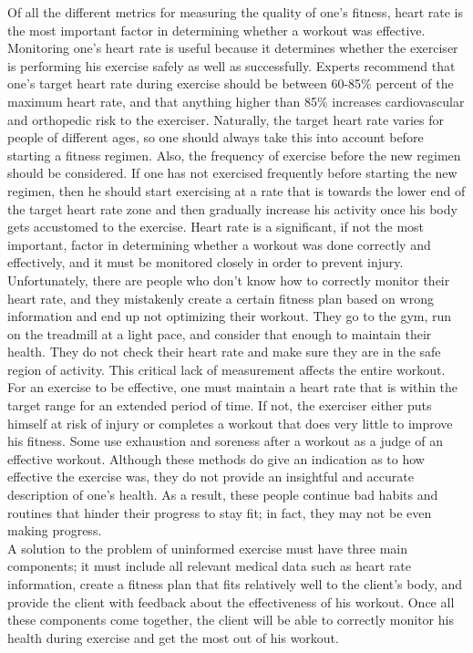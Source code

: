 \documentclass[letterpaper,english, 12pt]{scrreprt}
\begin{document}
Of all the different metrics for measuring the quality of one's fitness, heart rate is the most important factor in determining whether a workout was effective. Monitoring one's heart rate is useful because it determines whether the exerciser is performing his exercise safely as well as successfully. Experts recommend that one's target heart rate during exercise should be between 60-85\% percent of the maximum heart rate, and that anything higher than 85\% increases cardiovascular and orthopedic risk to the exerciser. Naturally, the target heart rate varies for people of different ages, so one should always take this into account before starting a fitness regimen. Also, the frequency of exercise before the new regimen should be considered. If one has not exercised frequently before starting the new regimen, then he should start exercising at a rate that is towards the lower end of the target heart rate zone and then gradually increase his activity once his body gets accustomed to the exercise. Heart rate is a significant, if not the most important, factor in determining whether a workout was done correctly and effectively, and it must be monitored closely in order to prevent injury.\\
 
Unfortunately, there are people who don't know how to correctly monitor their heart rate, and they mistakenly create a certain fitness plan based on wrong information and end up not optimizing their workout. They go to the gym, run on the treadmill at a light pace, and consider that enough to maintain their health. They do not check their heart rate and make sure they are in the safe region of activity. This critical lack of measurement affects the entire workout. For an exercise to be effective, one must maintain a heart rate that is within the target range for an extended period of time. If not, the exerciser either puts himself at risk of injury or completes a workout that does very little to improve his fitness. Some use exhaustion and soreness after a workout as a judge of an effective workout. Although these methods do give an indication as to how effective the exercise was, they do not provide an insightful and accurate description of one's health. As a result, these people continue bad habits and routines that hinder their progress to stay fit; in fact, they may not be even making progress.\\
 
A solution to the problem of uninformed exercise must have three main components; it must include all relevant medical data such as heart rate information, create a fitness plan that fits relatively well to the client's body, and provide the client with feedback about the effectiveness of his workout. Once all these components come together, the client will be able to correctly monitor his health during exercise and get the most out of his workout.\\
 
\end{document}
